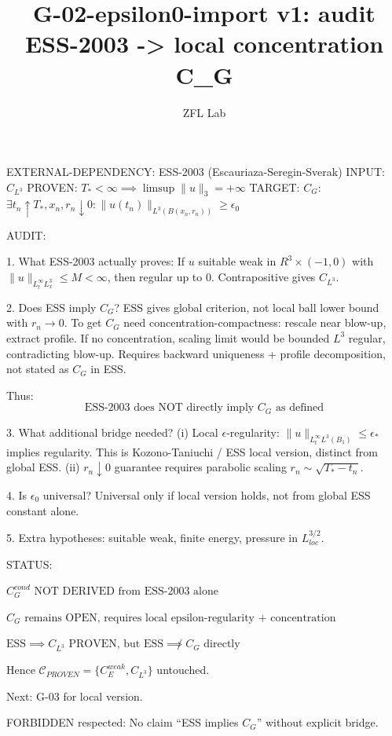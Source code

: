 \documentclass[11pt]{article}
\title{G-02-epsilon0-import v1: audit ESS-2003 -> local concentration C\_G}
\author{ZFL Lab}
\begin{document}
\maketitle

EXTERNAL-DEPENDENCY: ESS-2003 (Escauriaza-Seregin-Sverak)
INPUT: $C_{L^3}$ PROVEN: $T_*<\infty\implies \limsup\|u\|_3=+\infty$
TARGET: $C_G$: $\exists t_n\uparrow T_*, x_n, r_n\downarrow0: \|u(t_n)\|_{L^3(B(x_n,r_n))}\ge\epsilon_0$

AUDIT:

1. What ESS-2003 actually proves:
If $u$ suitable weak in $R^3\times(-1,0)$ with $\|u\|_{L^\infty_t L^3_x}\le M<\infty$, then regular up to 0. Contrapositive gives $C_{L^3}$.

2. Does ESS imply $C_G$?
ESS gives global criterion, not local ball lower bound with $r_n\to0$.
To get $C_G$ need concentration-compactness: rescale near blow-up, extract profile. If no concentration, scaling limit would be bounded $L^3$ regular, contradicting blow-up. Requires backward uniqueness + profile decomposition, not stated as $C_G$ in ESS.

Thus:
\begin{equation*}
\boxed{\text{ESS-2003 does NOT directly imply $C_G$ as defined}}
\end{equation*}

3. What additional bridge needed?
(i) Local $\epsilon$-regularity: $\|u\|_{L^\infty_t L^3(B_1)}\le \epsilon_*$ implies regularity. This is Kozono-Taniuchi / ESS local version, distinct from global ESS.
(ii) $r_n\downarrow0$ guarantee requires parabolic scaling $r_n\sim\sqrt{T_*-t_n}$.

4. Is $\epsilon_0$ universal?
Universal only if local version holds, not from global ESS constant alone.

5. Extra hypotheses: suitable weak, finite energy, pressure in $L^{3/2}_{loc}$.

STATUS:

$\boxed{C_G^{cond}\text{ NOT DERIVED from ESS-2003 alone}}$

$\boxed{C_G\text{ remains OPEN, requires local epsilon-regularity + concentration}}$

$\boxed{\text{ESS}\implies C_{L^3}\text{ PROVEN, but ESS}\not\implies C_G\text{ directly}}$

Hence $\mathcal{C}_{PROVEN}=\{C_E^{weak},C_{L^3}\}$ untouched.

Next: G-03 for local version.

FORBIDDEN respected: No claim ``ESS implies $C_G$'' without explicit bridge.
\end{document}
